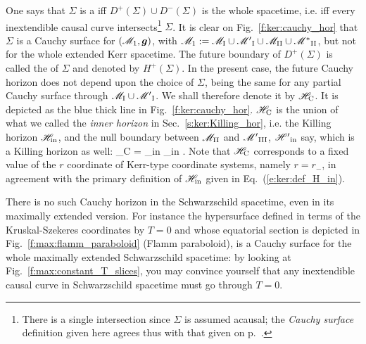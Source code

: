 One says that $\Sigma$ is a 
iff $D^+(\Sigma)\cup D^-(\Sigma)$ is the whole spacetime, i.e. iff
every inextendible causal curve intersects\footnote{There is a single
intersection since $\Sigma$ is assumed acausal; the \emph{Cauchy surface}
definition given here agrees thus with that given on p.~\pageref{d:sta:Cauchy_surface}.}
$\Sigma$.
It is clear on Fig.~\ref{f:ker:cauchy_hor} that $\Sigma$ is a Cauchy surface
for $(\mathscr{M}_1,\bm{g})$, with $\mathscr{M}_1 := \mathscr{M}_{\rm I}\cup{\mathscr{M}'}_{\rm I}\cup\mathscr{M}_{\rm II}\cup{\mathscr{M}^*}_{\rm II}$, but not for the whole extended Kerr spacetime. The future boundary of $D^+(\Sigma)$
is called the  of $\Sigma$ and denoted
by $H^+(\Sigma)$. In the present case, the future Cauchy horizon does not depend upon the
choice of $\Sigma$, being the same for any partial Cauchy surface through
$\mathscr{M}_{\rm I}\cup{\mathscr{M}'}_{\rm I}$. We shall therefore denote it by $\mathscr{H}_{\rm C}$.
It is depicted as the blue thick line in Fig.~\ref{f:ker:cauchy_hor}.
$\mathscr{H}_{\rm C}$ is the
union of what we called the \emph{inner horizon}
in Sec.~\ref{s:ker:Killing_hor}, i.e. the Killing horizon $\mathscr{H}_{\rm in}$,
and the null boundary between $\mathscr{M}_{\rm II}$ and ${\mathscr{M}'}_{\rm III}$, ${\mathscr{H}'}_{\rm in}$
say, which is a Killing horizon as well:
\be
    \Hor_{\rm C} = \Hor_{\rm in} _{\rm in} .
\ee
Note that $\mathscr{H}_{\rm C}$
corresponds to a fixed value of the $r$ coordinate of Kerr-type coordinate systems, namely
$r=r_-$, in agreement with the primary definition of $\mathscr{H}_{\rm in}$ given in Eq.~(\ref{e:ker:def_H_in}).

\begin{remark}
There is no such Cauchy horizon in the Schwarzschild spacetime, even in its
maximally extended version. For instance the hypersurface defined in
terms of the Kruskal-Szekeres coordinates by $T=0$ and whose equatorial section
is depicted in Fig.~\ref{f:max:flamm_paraboloid} (Flamm paraboloid), is a
Cauchy surface for the whole maximally extended Schwarzschild spacetime:
by looking at Fig.~\ref{f:max:constant_T_slices}, you may convince yourself
that any inextendible causal curve in Schwarzschild spacetime must go through $T=0$.
\end{remark}


